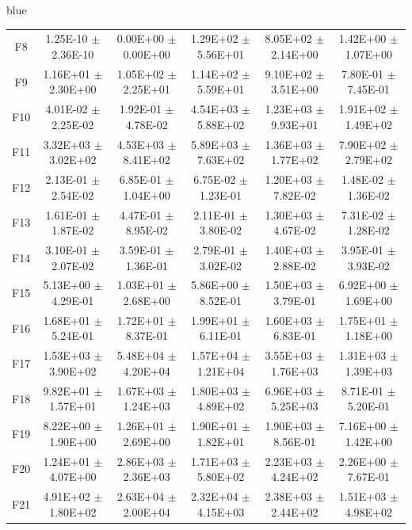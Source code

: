 \documentclass[journal, onecolumn]{IEEEtran}
\begin{document}
\begin{color}{blue}
\begin{table}[htbp!]
\begin{tabular}{c|ccccc}
		F8	 &	1.25E-10	$\pm$	2.36E-10		 &	0.00E+00	$\pm$	0.00E+00		 &	1.29E+02	$\pm$	5.56E+01		 &	8.05E+02	$\pm$	2.14E+00		 &	1.42E+00	$\pm$	1.07E+00	\\	
		F9	 &	1.16E+01	$\pm$	2.30E+00		 &	1.05E+02	$\pm$	2.25E+01		 &	1.14E+02	$\pm$	5.59E+01		 &	9.10E+02	$\pm$	3.51E+00		 &	7.80E-01	$\pm$	7.45E-01	\\	
		F10	 &	4.01E-02	$\pm$	2.25E-02		 &	1.92E-01	$\pm$	4.78E-02		 &	4.54E+03	$\pm$	5.88E+02		 &	1.23E+03	$\pm$	9.93E+01		 &	1.91E+02	$\pm$	1.49E+02	\\	
		F11	 &	3.32E+03	$\pm$	3.02E+02		 &	4.53E+03	$\pm$	8.41E+02		 &	5.89E+03	$\pm$	7.63E+02		 &	1.36E+03	$\pm$	1.77E+02		 &	7.90E+02	$\pm$	2.79E+02	\\	
		F12	 &	2.13E-01	$\pm$	2.54E-02		 &	6.85E-01	$\pm$	1.04E+00		 &	6.75E-02	$\pm$	1.23E-01		 &	1.20E+03	$\pm$	7.82E-02		 &	1.48E-02	$\pm$	1.36E-02	\\	
		F13	 &	1.61E-01	$\pm$	1.87E-02		 &	4.47E-01	$\pm$	8.95E-02		 &	2.11E-01	$\pm$	3.80E-02		 &	1.30E+03	$\pm$	4.67E-02		 &	7.31E-02	$\pm$	1.28E-02	\\	
		F14	 &	3.10E-01	$\pm$	2.07E-02		 &	3.59E-01	$\pm$	1.36E-01		 &	2.79E-01	$\pm$	3.02E-02		 &	1.40E+03	$\pm$	2.88E-02		 &	3.95E-01	$\pm$	3.93E-02	\\	
		F15	 &	5.13E+00	$\pm$	4.29E-01		 &	1.03E+01	$\pm$	2.68E+00		 &	5.86E+00	$\pm$	8.52E-01		 &	1.50E+03	$\pm$	3.79E-01		 &	6.92E+00	$\pm$	1.69E+00	\\	
		F16	 &	1.68E+01	$\pm$	5.24E-01		 &	1.72E+01	$\pm$	8.37E-01		 &	1.99E+01	$\pm$	6.11E-01		 &	1.60E+03	$\pm$	6.83E-01		 &	1.75E+01	$\pm$	1.18E+00	\\	
		F17	 &	1.53E+03	$\pm$	3.90E+02		 &	5.48E+04	$\pm$	4.20E+04		 &	1.57E+04	$\pm$	1.21E+04		 &	3.55E+03	$\pm$	1.76E+03		 &	1.31E+03	$\pm$	1.39E+03	\\	
		F18	 &	9.82E+01	$\pm$	1.57E+01		 &	1.67E+03	$\pm$	1.24E+03		 &	1.80E+03	$\pm$	4.89E+02		 &	6.96E+03	$\pm$	5.25E+03		 &	8.71E-01	$\pm$	5.20E-01	\\	
		F19	 &	8.22E+00	$\pm$	1.90E+00		 &	1.26E+01	$\pm$	2.69E+00		 &	1.90E+01	$\pm$	1.82E+01		 &	1.90E+03	$\pm$	8.56E-01		 &	7.16E+00	$\pm$	1.42E+00	\\	
		F20	 &	1.24E+01	$\pm$	4.07E+00		 &	2.86E+03	$\pm$	2.36E+03		 &	1.71E+03	$\pm$	5.80E+02		 &	2.23E+03	$\pm$	4.24E+02		 &	2.26E+00	$\pm$	7.67E-01	\\	
		F21	 &	4.91E+02	$\pm$	1.80E+02		 &	2.63E+04	$\pm$	2.00E+04		 &	2.32E+04	$\pm$	4.15E+03		 &	2.38E+03	$\pm$	2.44E+02		 &	1.51E+03	$\pm$	4.98E+02	\\	

\end{tabular}
\end{table}
\end{color}
\end{document}
